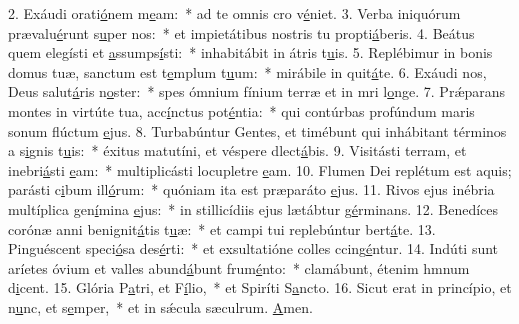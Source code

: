 2. Exáudi orati\uline{ó}nem m\uline{e}am:~* ad te omnis cro v\uline{é}niet.
3. Verba iniquórum prævalu\uline{é}runt s\uline{u}per nos:~* et impietátibus nostris tu propti\uline{á}beris.
4. Beátus quem elegísti et \uline{a}ssumps\uline{í}sti:~* inhabitábit in átris t\uline{u}is.
5. Replébimur in bonis domus tuæ, sanctum est t\uline{e}mplum t\uline{u}um:~* mirábile in quit\uline{á}te.
6. Exáudi nos, Deus salut\uline{á}ris n\uline{o}ster:~* spes ómnium fínium terræ et in mri l\uline{o}nge.
7. Prǽparans montes in virtúte tua, acc\uline{í}nctus pot\uline{é}ntia:~* qui contúrbas profúndum maris sonum flúctum \uline{e}jus.
8. Turbabúntur Gentes, et timébunt qui inhábitant términos a s\uline{i}gnis t\uline{u}is:~* éxitus matutíni, et véspere dlect\uline{á}bis.
9. Visitásti terram, et inebri\uline{á}sti \uline{e}am:~* multiplicásti locupletre \uline{e}am.
10. Flumen Dei replétum est aquis; parásti c\uline{i}bum ill\uline{ó}rum:~* quóniam ita est præparáto \uline{e}jus.
11. Rivos ejus inébria multíplica gen\uline{í}mina \uline{e}jus:~* in stillicídiis ejus lætábtur g\uline{é}rminans.
12. Benedíces corónæ anni benignit\uline{á}tis t\uline{u}æ:~* et campi tui replebúntur bert\uline{á}te.
13. Pinguéscent speci\uline{ó}sa des\uline{é}rti:~* et exsultatióne colles ccing\uline{é}ntur.
14. Indúti sunt aríetes óvium et valles abund\uline{á}bunt frum\uline{é}nto:~* clamábunt, étenim hmnum d\uline{i}cent.
15. Glória P\uline{a}tri, et F\uline{í}lio,~* et Spiríti S\uline{a}ncto.
16. Sicut erat in princípio, et n\uline{u}nc, et s\uline{e}mper,~* et in sǽcula sæculrum. \uline{A}men.
